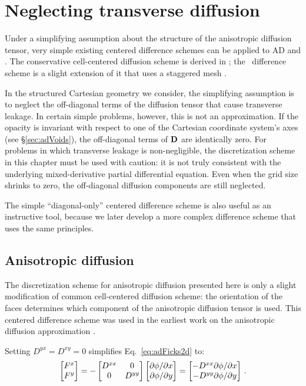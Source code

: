 \section{Neglecting transverse diffusion}\label{sec:discreteDiag}

Under a simplifying assumption about the structure of the anisotropic diffusion
tensor, very simple existing centered difference schemes can be
applied to AD and \APone. The conservative cell-centered diffusion scheme is
derived in \cite{Dud1976}; the \APone\ difference scheme is a slight extension
of it that uses a staggered mesh \cite{War2003}.

In the structured Cartesian geometry we consider, the simplifying assumption is
to neglect the off-diagonal terms of the diffusion tensor that cause transverse
leakage.
In certain simple problems, however, this is not an approximation. If the
opacity is invariant with respect to one of the Cartesian coordinate system's
axes (see \S\ref{sec:adVoids}), the off-diagonal terms of $\mathbf{D}$ are
identically zero. For problems in which transverse leakage is non-negligible,
the discretization scheme in this chapter must be used with caution: it is not
truly consistent with the underlying mixed-derivative partial differential
equation. Even when the grid size shrinks to zero, the off-diagonal diffusion
components are still neglected.

The simple ``diagonal-only'' centered difference scheme is also useful as an
instructive tool, because we later develop a more complex difference scheme that
uses the same principles.

\subsection{Anisotropic diffusion}
The discretization scheme for anisotropic diffusion presented here is only a
slight modification of common cell-centered diffusion scheme: the
orientation of the faces determines which component of the anisotropic diffusion
tensor is used.  This centered difference scheme was used in the earliest work
on the anisotropic diffusion approximation \cite{Lar2009c}.

Setting $D^{yx}=D^{xy}=0$ simplifies Eq.~\eqref{eq:adFicks2d} to:
\begin{equation*}
  \begin{bmatrix}
    F^{x} \\
    F^{y}
  \end{bmatrix}
  = -
  \begin{bmatrix}
    D^{xx} & 0 \\
    0 & D^{yy}
  \end{bmatrix}
  \begin{bmatrix}
    {\partial \phi}/{\partial x} \\
    {\partial \phi}/{\partial y}
  \end{bmatrix}
  = 
  \begin{bmatrix}
    - D^{xx} {\partial \phi}/{\partial x} \\
    - D^{yy} {\partial \phi}/{\partial y}
  \end{bmatrix}
  \,.
\end{equation*}

